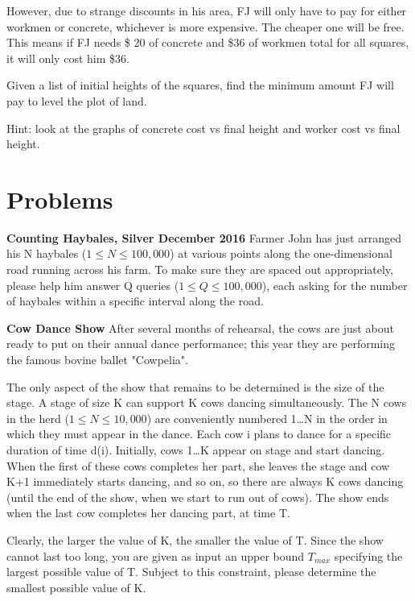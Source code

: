 \documentclass[11pt]{article}
\begin{document}
However, due to strange discounts in his area, FJ will only have to pay for either workmen or concrete, whichever is more expensive.  The cheaper one will be free.  This means if FJ needs \$ 20 of concrete and \$36 of workmen total for all squares, it will only cost him \$36.

Given a list of initial heights of the squares, find the minimum amount FJ will pay to level the plot of land. 

Hint: look at the graphs of concrete cost vs final height and worker cost vs final height. 

\section{Problems}
\textbf{Counting Haybales, Silver December 2016}
\newline
Farmer John has just arranged his N haybales ($1\leq N\leq100,000$) at various points along the one-dimensional road running across his farm. To make sure they are spaced out appropriately, please help him answer Q queries ($1\leq Q\leq100,000$), each asking for the number of haybales within a specific interval along the road. 
\newline

\noindent
\textbf{Cow Dance Show}
\newline
After several months of rehearsal, the cows are just about ready to put on their annual dance performance; this year they are performing the famous bovine ballet "Cowpelia".

The only aspect of the show that remains to be determined is the size of the stage. A stage of size K
can support K cows dancing simultaneously. The N cows in the herd ($1\leq N\leq10,000$) are conveniently numbered 1…N in the order in which they must appear in the dance. Each cow i plans to dance for a specific duration of time d(i). Initially, cows 1…K appear on stage and start dancing. When the first of these cows completes her part, she leaves the stage and cow K+1 immediately starts dancing, and so on, so there are always K cows dancing (until the end of the show, when we start to run out of cows). The show ends when the last cow completes her dancing part, at time T.

Clearly, the larger the value of K, the smaller the value of T. Since the show cannot last too long, you are given as input an upper bound $T_{max}$ specifying the largest possible value of T. Subject to this constraint, please determine the smallest possible value of K. 
\end{document}

